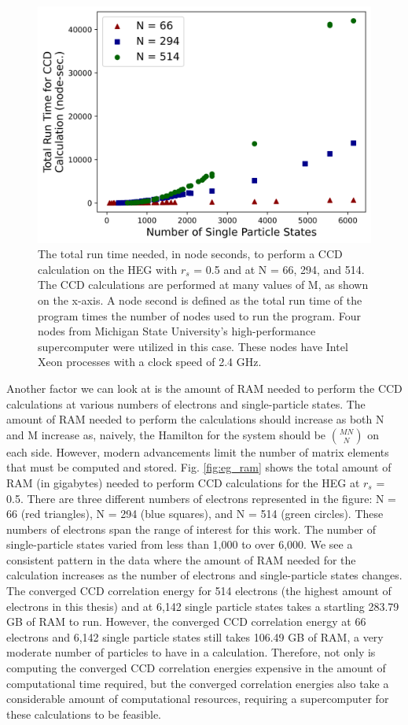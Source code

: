 \begin{figure}
    \centering
    \includegraphics[scale=0.75]{Images/Chapter7/ElectronGas/EG_timing_graph_node_sec.png}
    \caption{The total run time needed, in node seconds, to perform a CCD calculation on the HEG with $r_s$ = 0.5 and at N = 66, 294, and 514. The CCD calculations are performed at many values of M, as shown on the x-axis. A node second is defined as the total run time of the program times the number of nodes used to run the program. Four nodes from Michigan State University's high-performance supercomputer were utilized in this case. These nodes have Intel Xeon processes with a clock speed of 2.4 GHz.}
    \label{fig:EG_times}
\end{figure}

Another factor we can look at is the amount of RAM needed to perform the CCD calculations at various numbers of electrons and single-particle states. The amount of RAM needed to perform the calculations should increase as both N and M increase as, naively, the Hamilton for the system should be ${MN}\choose{N}$ on each side. However, modern advancements limit the number of matrix elements that must be computed and stored. Fig. \ref{fig:eg_ram} shows the total amount of RAM (in gigabytes) needed to perform CCD calculations for the HEG at $r_s$ = 0.5. There are three different numbers of electrons represented in the figure: N = 66 (red triangles), N = 294 (blue squares), and N = 514 (green circles). These numbers of electrons span the range of interest for this work. The number of single-particle states varied from less than 1,000 to over 6,000. We see a consistent pattern in the data where the amount of RAM needed for the calculation increases as the number of electrons and single-particle states changes. The converged CCD correlation energy for 514 electrons (the highest amount of electrons in this thesis) and at 6,142 single particle states takes a startling 283.79 GB of RAM to run. However, the converged CCD correlation energy at 66 electrons and 6,142 single particle states still takes 106.49 GB of RAM, a very moderate number of particles to have in a calculation. Therefore, not only is computing the converged CCD correlation energies expensive in the amount of computational time required, but the converged correlation energies also take a considerable amount of computational resources, requiring a supercomputer for these calculations to be feasible.

